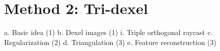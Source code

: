
\chapter{Method 2: Tri-dexel}
\label{ch:tri_dexel}

a.	Basic idea (1)
b.	Dexel images (1)
i.	Triple orthogonal raycast
c.	Regularization (2)
d.	Triangulation (3)
e.	Feature reconstruction (3)
